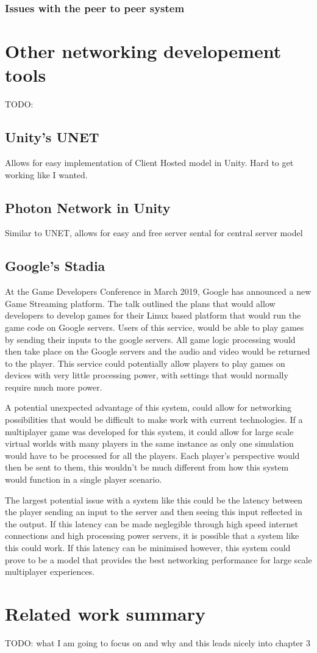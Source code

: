 \subsubsection{Issues with the peer to peer system}


\newpage
\section{Other networking developement tools}
TODO:

\subsection{Unity's UNET}
Allows for easy implementation of Client Hosted model in Unity. Hard to get working like I wanted.


\subsection{Photon Network in Unity}
Similar to UNET, allows for easy and free server sental for central server model


\subsection{Google's Stadia}
At the Game Developers Conference in March 2019, Google has announced a new Game Streaming platform. The talk outlined the plans that would allow developers to develop games for their Linux based platform that would run the game code on Google servers. Users of this service, would be able to play games by sending their inputs to the google servers. All game logic processing would then take place on the Google servers and the audio and video would be returned to the player. This service could potentially allow players to play games on devices with very little processing power, with settings that would normally require much more power.

A potential unexpected advantage of this system, could allow for networking possibilities that would be difficult to make work with current technologies. If a multiplayer game was developed for this system, it could allow for large scale virtual worlds with many players in the same instance as only one simulation would have to be processed for all the players. Each player's perspective would then be sent to them, this wouldn't be much different from how this system would function in a single player scenario.

The largest potential issue with a system like this could be the latency between the player sending an input to the server and then seeing this input reflected in the output. If this latency can be made neglegible through high speed internet connections and high processing power servers, it is possible that a system like this could work. If this latency can be minimised however, this system could prove to be a model that provides the best networking performance for large scale multiplayer experiences.


\section{Related work summary}
TODO: what I am going to focus on and why and this leads nicely into chapter 3
